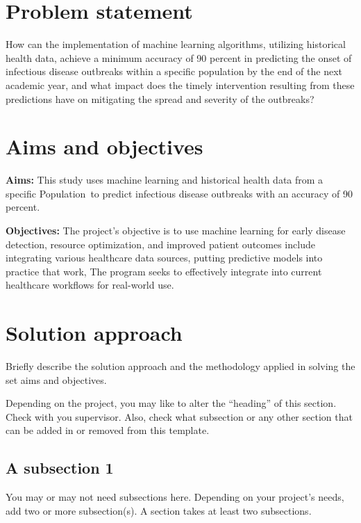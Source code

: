 \section{Problem statement}
\label{sec:intro_prob_art}
How can the implementation of machine learning algorithms, utilizing historical health data, 
achieve a minimum accuracy of 90 percent in predicting the onset of infectious disease outbreaks 
within a specific population by the end of the next academic year, and what impact does the 
timely intervention resulting from these predictions have on mitigating the spread and severity 
of the outbreaks?

\section{Aims and objectives}
\label{sec:intro_aims_obj}


\textbf{Aims:} This study uses machine learning and historical health data from a specific Population to predict infectious disease outbreaks with an accuracy of 90 percent.  

\textbf{Objectives:} The project's objective is to use machine learning for early disease detection, resource optimization, and improved patient outcomes include integrating various healthcare data sources, putting predictive models into practice that work, The program seeks to effectively integrate into current healthcare workflows for real-world use.



\section{Solution approach}
\label{sec:intro_sol} %
Briefly describe the solution approach and the methodology applied in solving the set aims and objectives.

Depending on the project, you may like to alter the ``heading'' of this section. Check with you supervisor. Also, check what subsection or any other section that can be added in or removed from this template.

\subsection{A subsection 1}
\label{sec:intro_some_sub1}
You may or may not need subsections here. Depending on your project's needs, add two or more subsection(s). A section takes at least two subsections. 

